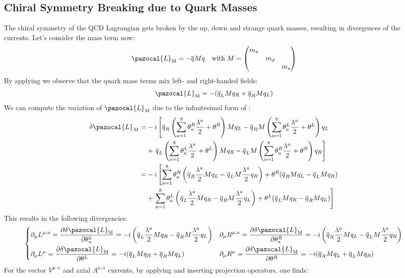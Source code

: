 \documentclass[../main.tex]{subfiles}
\begin{document}
\subsection{Chiral Symmetry Breaking due to Quark Masses}
The chiral symmetry of the QCD Lagrangian gets broken by the up, down and strange quark masses, resulting in divergences of the currents. Let's consider the mass term now:
\[
\pazocal{L}_{\text{M}}=-\overline{q}Mq \quad \text{with}\;M=\mqty(\dmat{m_u,m_d,m_s})
\]
By applying  we observe that the quark mass terms mix left- and right-handed fields:
\[
\pazocal{L}_{\text{M}}=-(\overline{q}_LMq_R+\overline{q}_RMq_L)
\]
We can compute the variation of $\pazocal{L}_{\text{M}}$ due to the infinitesimal form of :
\begin{align*}
\delta\pazocal{L}_M=&-i\left[\overline{q}_R\left(\sum_{a=1}^8\theta_a^R\frac{\lambda^a}{2}+\theta^R\right)Mq_L-\overline{q}_RM\left(\sum_{a=1}^8\theta_a^L\frac{\lambda^a}{2}+\theta^L\right)q_L\right.\\
&+\left.\overline{q}_L\left(\sum_{a=1}^8\theta_a^L\frac{\lambda^a}{2}+\theta^L\right)Mq_R-\overline{q}_LM\left(\sum_{a=1}^8\theta_a^R\frac{\lambda^a}{2}+\theta^R\right)q_R\right]\\
=&-i\left[\sum_{a=1}^8\theta_a^R\left(\overline{q}_R\frac{\lambda^a}{2}Mq_L-\overline{q}_LM\frac{\lambda^a}{2}q_R\right)+\theta^R(\overline{q}_RMq_L-\overline{q}_LMq_R)\right.\\
&+\left.\sum_{a=1}^8\theta_a^L\left(\overline{q}_L\frac{\lambda^a}{2}Mq_R-\overline{q}_RM\frac{\lambda^a}{2}q_L\right)+\theta^L(\overline{q}_LMq_R-\overline{q}_RMq_L)\right]
\end{align*}
This results in the following divergencies:
\[
\left\{
\begin{aligned}
&\partial_\mu L^{\mu,a}=\frac{\partial\delta\pazocal{L}_{\text{M}}}{\partial\theta_a^L}=-i\left(\overline{q}_L\frac{\lambda^a}{2}Mq_R-\overline{q}_RM\frac{\lambda^a}{2}q_L\right) &&\partial_\mu R^{\mu,a}=\frac{\partial\delta\pazocal{L}_{\text{M}}}{\partial\theta_a^R}=-i\left(\overline{q}_R\frac{\lambda^a}{2}Mq_L-\overline{q}_LM\frac{\lambda^a}{2}q_R\right)\\
&\partial_\mu L^\mu=\frac{\partial\delta\pazocal{L}_{\text{M}}}{\partial\theta^L}=-i(\overline{q}_LMq_R+\overline{q}_RMq_L) &&\partial_\mu R^\mu=\frac{\partial\delta\pazocal{L}_{\text{M}}}{\partial\theta^R}=-i(\overline{q}_RMq_L+\overline{q}_LMq_R)
\end{aligned}
\right.
\]
For the vector $V^{\mu,a}$ and axial $A^{\mu,a}$ currents, by applying  and inserting projection operators, one finds:
\end{document}
